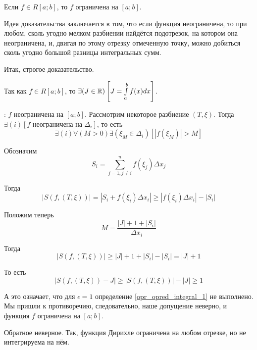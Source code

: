 \begin{teorema}
Если $f\in R[a;b]$, то $f$ ограничена на $[a;b]$.
\end{teorema}

\dokvo

Идея доказательства заключается в том, что если функция неограничена, то при любом, сколь угодно мелком разбиении найдётся подотрезок, на котором она неограничена, и, двигая по этому отрезку отмеченную точку, можно добиться сколь угодно большой разницы интегральных сумм.

Итак, строгое доказательство.

Так как $f\in R[a;b]$, то $\exists(J\in \mathbb{R})\left[J=\int\limits_a^b f(x) dx\right]$.

\pp: $f$ неограничена на $[a;b]$.
Рассмотрим некоторое разбиение $(T,\xi)$.
Тогда $\exists(i)[f \mbox{~неограничена на~}\Delta_i]$, то есть
$$
\exists(i)\forall(M>0)\exists(\xi_M \in \Delta_i)[|f(\xi_M)|>M]
$$

Обозначим
$$
S_i=\sum_{j=1,j\neq i}^n f(\xi_j)\Delta x_j
$$

Тогда
$$
|S(f,(T,\xi))|=|S_i+f(\xi_i)\Delta x_i|\geq
|f(\xi_i)\Delta x_i|-|S_i|
$$

Положим теперь
$$
M=\frac{|J|+1+|S_i|}{\Delta x_i}
$$

Тогда 
$$
|S(f,(T,\xi))|\geq |J|+1+|S_i|-|S_i|=|J|+1
$$

То есть
$$
|S(f,(T,\xi))-J|\geq|S(f,(T,\xi))|-|J|\geq 1
$$

А это означает, что для $\epsilon=1$ определение \ref{opr_opred_integral_1} не выполнено.
Мы пришли к противоречию, следовательно, наше допущение неверно, и функция $f$ ограничена на $[a;b]$.

\dokno

\begin{zamech}
Обратное неверное.
Так, функция Дирихле ограничена на любом отрезке, но не интегрируема на нём.
\end{zamech}


